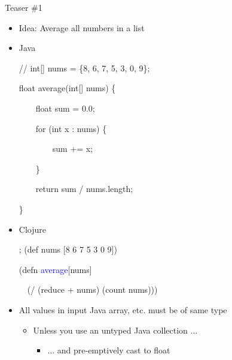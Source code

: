\documentclass{beamer}
\begin{document}
\begin{frame}{Teaser \#1}
	\begin{itemize}
        \item Idea: Average all numbers in a list
        \item Java\\
\begin{small}
{\ttfamily\color{black}
%
\textcolor[rgb]{0.69803923,0.13333334,0.13333334}{// int[] nums = \{8,
6, 7, 5, 3, 0, 9\};}}

{\ttfamily\color{black}
\textcolor[rgb]{0.13333334,0.54509807,0.13333334}{float}
\textcolor[rgb]{0.627451,0.32156864,0.1764706}{average}(\textcolor[rgb]{0.13333334,0.54509807,0.13333334}{int}[]
\textcolor[rgb]{0.627451,0.32156864,0.1764706}{nums}) \{}

{\ttfamily\color{black}
\ \ \ \ \textcolor[rgb]{0.13333334,0.54509807,0.13333334}{float}
\textcolor[rgb]{0.627451,0.32156864,0.1764706}{sum} = 0.0;}

{\ttfamily\color{black}
\ \ \ \ \textcolor[rgb]{0.49803922,0.0,0.49803922}{for}
(\textcolor[rgb]{0.13333334,0.54509807,0.13333334}{int}
\textcolor[rgb]{0.627451,0.32156864,0.1764706}{x} : nums) \{}

{\ttfamily\color{black}
\ \ \ \ \ \ \ \ sum += x;}

{\ttfamily\color{black}
\ \ \ \ \}}

{\ttfamily\color{black}
\ \ \ \ \textcolor[rgb]{0.49803922,0.0,0.49803922}{return} sum /
nums.length;}

{\ttfamily\color{black}
\}}
\end{small}
        \item Clojure\\
\begin{small}
{\ttfamily\color{black}
%
\textcolor[rgb]{0.69803923,0.13333334,0.13333334}{; (def nums [8 6 7 5 3
0 9])}}

{\ttfamily\color{black}
\textcolor[rgb]{0.54901963,0.54901963,0.54901963}{(}\textcolor[rgb]{0.49803922,0.0,0.49803922}{defn}
\textcolor{blue}{average}[nums]}

{\ttfamily\color{black}
\ \ \textcolor[rgb]{0.54901963,0.54901963,0.54901963}{(}\textcolor[rgb]{0.28235295,0.23921569,0.54509807}{/}
\textcolor[rgb]{0.54901963,0.54901963,0.54901963}{(}\textcolor[rgb]{0.28235295,0.23921569,0.54509807}{reduce}
+ nums\textcolor[rgb]{0.54901963,0.54901963,0.54901963}{)}
\textcolor[rgb]{0.54901963,0.54901963,0.54901963}{(}\textcolor[rgb]{0.28235295,0.23921569,0.54509807}{count}
nums\textcolor[rgb]{0.54901963,0.54901963,0.54901963}{)))}}
\end{small}
	\item All values in input Java array, etc. must be of same type	  	
		\begin{itemize}
		\item Unless you use an untyped Java collection $\ldots$
			\begin{itemize}
			\item $\ldots$ and pre-emptively cast to float
			\end{itemize}
		\end{itemize}
	\end{itemize}
\end{frame}
\end{document}
